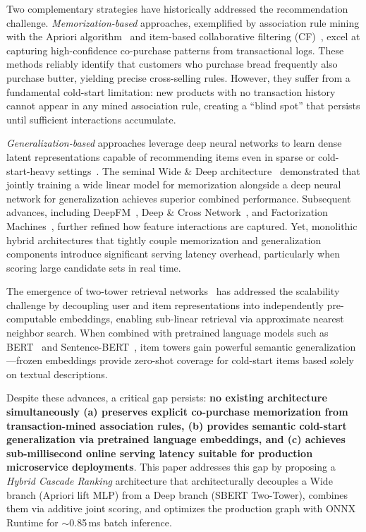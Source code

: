 \documentclass[10pt,conference]{IEEEtran}
\begin{document}
Two complementary strategies have historically addressed the recommendation challenge. \textit{Memorization-based} approaches, exemplified by association rule mining with the Apriori algorithm~\cite{agrawal1994fast} and item-based collaborative filtering (CF)~\cite{sarwar2001item}, excel at capturing high-confidence co-purchase patterns from transactional logs. These methods reliably identify that customers who purchase bread frequently also purchase butter, yielding precise cross-selling rules. However, they suffer from a fundamental cold-start limitation: new products with no transaction history cannot appear in any mined association rule, creating a ``blind spot'' that persists until sufficient interactions accumulate.

\textit{Generalization-based} approaches leverage deep neural networks to learn dense latent representations capable of recommending items even in sparse or cold-start-heavy settings~\cite{he2017neural, cheng2016wide}. The seminal Wide \& Deep architecture~\cite{cheng2016wide} demonstrated that jointly training a wide linear model for memorization alongside a deep neural network for generalization achieves superior combined performance. Subsequent advances, including DeepFM~\cite{guo2017deepfm}, Deep \& Cross Network~\cite{wang2017deep}, and Factorization Machines~\cite{rendle2010factorization}, further refined how feature interactions are captured. Yet, monolithic hybrid architectures that tightly couple memorization and generalization components introduce significant serving latency overhead, particularly when scoring large candidate sets in real time.

The emergence of two-tower retrieval networks~\cite{covington2016deep, yi2019sampling, yang2020mixed} has addressed the scalability challenge by decoupling user and item representations into independently pre-computable embeddings, enabling sub-linear retrieval via approximate nearest neighbor search. When combined with pretrained language models such as BERT~\cite{devlin2019bert} and Sentence-BERT~\cite{reimers2019sentence}, item towers gain powerful semantic generalization---frozen embeddings provide zero-shot coverage for cold-start items based solely on textual descriptions.

Despite these advances, a critical gap persists: \textbf{no existing architecture simultaneously (a) preserves explicit co-purchase memorization from transaction-mined association rules, (b) provides semantic cold-start generalization via pretrained language embeddings, and (c) achieves sub-millisecond online serving latency suitable for production microservice deployments}. This paper addresses this gap by proposing a \textit{Hybrid Cascade Ranking} architecture that architecturally decouples a Wide branch (Apriori lift MLP) from a Deep branch (SBERT Two-Tower), combines them via additive joint scoring, and optimizes the production graph with ONNX Runtime for $\sim$0.85\,ms batch inference.
\end{document}
